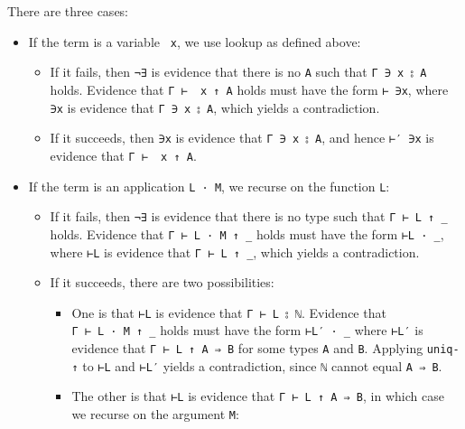 There are three cases:

\begin{itemize}
\item
  If the term is a variable \texttt{\textasciigrave{}\ x}, we use lookup
  as defined above:

  \begin{itemize}
  \item
    If it fails, then \texttt{¬∃} is evidence that there is no
    \texttt{A} such that \texttt{Γ\ ∋\ x\ ⦂\ A} holds. Evidence that
    \texttt{Γ\ ⊢\ \textasciigrave{}\ x\ ↑\ A} holds must have the form
    \texttt{⊢\textasciigrave{}\ ∋x}, where \texttt{∋x} is evidence that
    \texttt{Γ\ ∋\ x\ ⦂\ A}, which yields a contradiction.
  \item
    If it succeeds, then \texttt{∋x} is evidence that
    \texttt{Γ\ ∋\ x\ ⦂\ A}, and hence \texttt{⊢′\ ∋x} is evidence that
    \texttt{Γ\ ⊢\ \textasciigrave{}\ x\ ↑\ A}.
  \end{itemize}
\item
  If the term is an application \texttt{L\ ·\ M}, we recurse on the
  function \texttt{L}:

  \begin{itemize}
  \item
    If it fails, then \texttt{¬∃} is evidence that there is no type such
    that \texttt{Γ\ ⊢\ L\ ↑\ \_} holds. Evidence that
    \texttt{Γ\ ⊢\ L\ ·\ M\ ↑\ \_} holds must have the form
    \texttt{⊢L\ ·\ \_}, where \texttt{⊢L} is evidence that
    \texttt{Γ\ ⊢\ L\ ↑\ \_}, which yields a contradiction.
  \item
    If it succeeds, there are two possibilities:

    \begin{itemize}
    \item
      One is that \texttt{⊢L} is evidence that
      \texttt{Γ\ ⊢\ L\ ⦂\ \textasciigrave{}ℕ}. Evidence that
      \texttt{Γ\ ⊢\ L\ ·\ M\ ↑\ \_} holds must have the form
      \texttt{⊢L′\ ·\ \_} where \texttt{⊢L′} is evidence that
      \texttt{Γ\ ⊢\ L\ ↑\ A\ ⇒\ B} for some types \texttt{A} and
      \texttt{B}. Applying \texttt{uniq-↑} to \texttt{⊢L} and
      \texttt{⊢L′} yields a contradiction, since
      \texttt{\textasciigrave{}ℕ} cannot equal \texttt{A\ ⇒\ B}.
    \item
      The other is that \texttt{⊢L} is evidence that
      \texttt{Γ\ ⊢\ L\ ↑\ A\ ⇒\ B}, in which case we recurse on the
      argument \texttt{M}:


\end{itemize}
\end{itemize}
\end{itemize}
